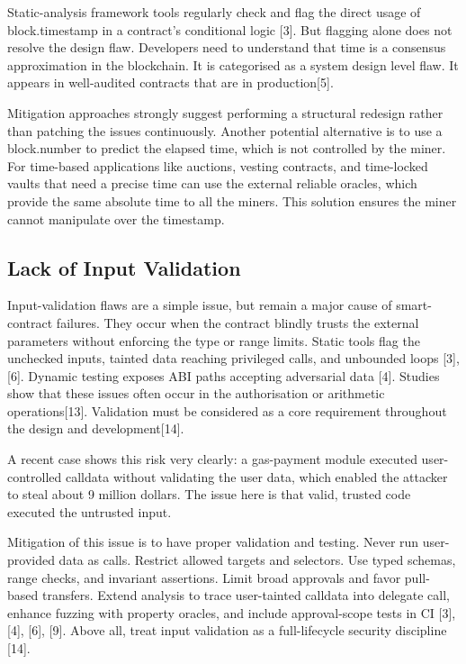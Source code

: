 \documentclass[conference]{IEEEtran}
\begin{document}
Static-analysis framework tools regularly check and flag the direct usage of block.timestamp in a contract's conditional logic [3]. But flagging alone does not resolve the design flaw. Developers need to understand that time is a consensus approximation in the blockchain. It is categorised as a system design level flaw. It appears in well-audited contracts that are in production[5].

Mitigation approaches strongly suggest performing a structural redesign rather than patching the issues continuously. Another potential alternative is to use a block.number to predict the elapsed time, which is not controlled by the miner. For time-based applications like auctions, vesting contracts, and time-locked vaults that need a precise time can use the external reliable oracles, which provide the same absolute time to all the miners. This solution ensures the miner cannot manipulate over the timestamp.

\subsection{Lack of Input Validation}
Input-validation flaws are a simple issue, but remain a major cause of smart-contract failures. They occur when the contract blindly trusts the external parameters without enforcing the type or range limits. Static tools flag the unchecked inputs, tainted data reaching privileged calls, and unbounded loops [3], [6]. Dynamic testing exposes ABI paths accepting adversarial data [4]. Studies show that these issues often occur in the authorisation or arithmetic operations[13]. Validation must be considered as a core requirement throughout the design and development[14].

A recent case shows this risk very clearly: a gas-payment module executed user-controlled calldata without validating the user data, which enabled the attacker to steal about 9 million dollars. The issue here is that valid, trusted code executed the untrusted input.

Mitigation of this issue is to have proper validation and testing. Never run user-provided data as calls. Restrict allowed targets and selectors. Use typed schemas, range checks, and invariant assertions. Limit broad approvals and favor pull-based transfers. Extend analysis to trace user-tainted calldata into delegate call, enhance fuzzing with property oracles, and include approval-scope tests in CI [3], [4], [6], [9]. Above all, treat input validation as a full-lifecycle security discipline [14].
\end{document}
